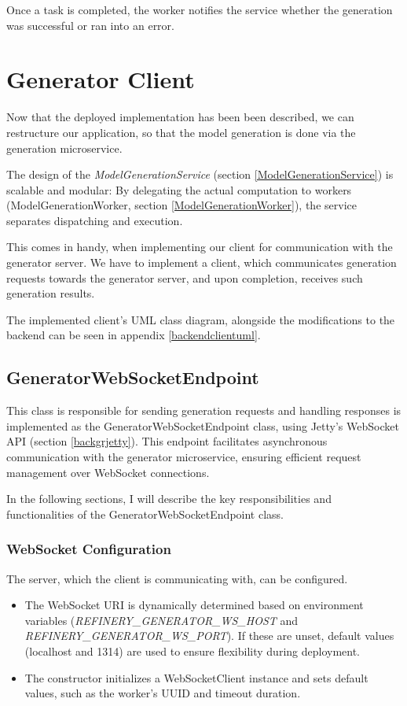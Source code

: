 			Once a task is completed, the worker notifies the service whether the generation was successful or ran into an error. 

	\section{Generator Client} \label{Generator Client}
			Now that the deployed implementation has been been described, we can restructure our application, so that the 
			model generation is done via the generation microservice.

			The design of the \textit{ModelGenerationService} (section \ref{ModelGenerationService}) is scalable and modular:
			By delegating the actual computation to workers (ModelGenerationWorker, section \ref{ModelGenerationWorker}), 
			the service separates dispatching and execution. 
			
			This comes in handy, when implementing our client for communication with
			the generator server. We have to implement a client, which communicates generation requests towards the generator server,
			and upon completion, receives such generation results.

			The implemented client's UML class diagram, alongside the modifications to the backend can be seen in appendix \ref{backendclientuml}.

			\subsection{GeneratorWebSocketEndpoint} \label{GeneratorWebSocketEndpoint}
				This class is responsible for sending generation requests and handling responses is implemented as the 
				GeneratorWebSocketEndpoint class,
				using Jetty's WebSocket API (section \ref{backgrjetty}). 
				This endpoint facilitates asynchronous communication with the generator microservice, 
				ensuring efficient request management over WebSocket connections. 

			In the following sections, I will describe the key responsibilities and functionalities of the GeneratorWebSocketEndpoint class.
			\subsubsection{WebSocket Configuration} 
				The server, which the client is communicating with, can be configured.
				\begin{itemize}
					\item The WebSocket URI is dynamically determined based on environment variables (\textit{REFINERY\_GENERATOR\_WS\_HOST} 
					and \textit{REFINERY\_GENERATOR\_WS\_PORT}). If these are unset, default values (localhost and 1314) are used to ensure flexibility during deployment.
					\item The constructor initializes a WebSocketClient instance and sets default values, such as the worker's UUID and timeout duration.
				\end{itemize} 
